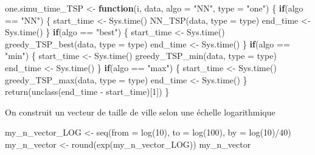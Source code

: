 \documentclass[
]{article}
\newenvironment{Shaded}{\begin{snugshade}}{\end{snugshade}}
\newcommand{\AttributeTok}[1]{\textcolor[rgb]{0.77,0.63,0.00}{#1}}
\newcommand{\ControlFlowTok}[1]{\textcolor[rgb]{0.13,0.29,0.53}{\textbf{#1}}}
\newcommand{\DecValTok}[1]{\textcolor[rgb]{0.00,0.00,0.81}{#1}}
\newcommand{\FunctionTok}[1]{\textcolor[rgb]{0.00,0.00,0.00}{#1}}
\newcommand{\NormalTok}[1]{#1}
\newcommand{\OtherTok}[1]{\textcolor[rgb]{0.56,0.35,0.01}{#1}}
\newcommand{\SpecialCharTok}[1]{\textcolor[rgb]{0.00,0.00,0.00}{#1}}
\newcommand{\StringTok}[1]{\textcolor[rgb]{0.31,0.60,0.02}{#1}}
\begin{document}
\begin{Shaded}
\begin{Highlighting}[]
\NormalTok{one.simu\_time\_TSP }\OtherTok{\textless{}{-}} \ControlFlowTok{function}\NormalTok{(i, data, }\AttributeTok{algo =} \StringTok{"NN"}\NormalTok{, }\AttributeTok{type =} \StringTok{"one"}\NormalTok{)}
\NormalTok{\{}
  \ControlFlowTok{if}\NormalTok{(algo }\SpecialCharTok{==} \StringTok{"NN"}\NormalTok{)}
\NormalTok{  \{}
\NormalTok{    start\_time }\OtherTok{\textless{}{-}} \FunctionTok{Sys.time}\NormalTok{()}
    \FunctionTok{NN\_TSP}\NormalTok{(data, }\AttributeTok{type =}\NormalTok{ type)}
\NormalTok{    end\_time  }\OtherTok{\textless{}{-}} \FunctionTok{Sys.time}\NormalTok{()}
\NormalTok{  \}}
  \ControlFlowTok{if}\NormalTok{(algo }\SpecialCharTok{==} \StringTok{"best"}\NormalTok{)}
\NormalTok{  \{}
\NormalTok{    start\_time }\OtherTok{\textless{}{-}} \FunctionTok{Sys.time}\NormalTok{()}
    \FunctionTok{greedy\_TSP\_best}\NormalTok{(data, }\AttributeTok{type =}\NormalTok{ type)}
\NormalTok{    end\_time  }\OtherTok{\textless{}{-}} \FunctionTok{Sys.time}\NormalTok{()}
\NormalTok{  \}}
  \ControlFlowTok{if}\NormalTok{(algo }\SpecialCharTok{==} \StringTok{"min"}\NormalTok{)}
\NormalTok{  \{}
\NormalTok{    start\_time }\OtherTok{\textless{}{-}} \FunctionTok{Sys.time}\NormalTok{()}
    \FunctionTok{greedy\_TSP\_min}\NormalTok{(data, }\AttributeTok{type =}\NormalTok{ type)}
\NormalTok{    end\_time  }\OtherTok{\textless{}{-}} \FunctionTok{Sys.time}\NormalTok{()}
\NormalTok{  \}}
  \ControlFlowTok{if}\NormalTok{(algo }\SpecialCharTok{==} \StringTok{"max"}\NormalTok{)}
\NormalTok{  \{}
\NormalTok{    start\_time }\OtherTok{\textless{}{-}} \FunctionTok{Sys.time}\NormalTok{()}
    \FunctionTok{greedy\_TSP\_max}\NormalTok{(data, }\AttributeTok{type =}\NormalTok{ type)}
\NormalTok{    end\_time  }\OtherTok{\textless{}{-}} \FunctionTok{Sys.time}\NormalTok{()}
\NormalTok{  \}}
  \FunctionTok{return}\NormalTok{(}\FunctionTok{unclass}\NormalTok{(end\_time }\SpecialCharTok{{-}}\NormalTok{ start\_time)[}\DecValTok{1}\NormalTok{])}
\NormalTok{\}}
\end{Highlighting}
\end{Shaded}

On construit un vecteur de taille de ville selon une échelle
logarithmique

\begin{Shaded}
\begin{Highlighting}[]
\NormalTok{my\_n\_vector\_LOG }\OtherTok{\textless{}{-}} \FunctionTok{seq}\NormalTok{(}\AttributeTok{from =} \FunctionTok{log}\NormalTok{(}\DecValTok{10}\NormalTok{), }\AttributeTok{to =} \FunctionTok{log}\NormalTok{(}\DecValTok{100}\NormalTok{), }\AttributeTok{by =} \FunctionTok{log}\NormalTok{(}\DecValTok{10}\NormalTok{)}\SpecialCharTok{/}\DecValTok{40}\NormalTok{)}
\NormalTok{my\_n\_vector }\OtherTok{\textless{}{-}} \FunctionTok{round}\NormalTok{(}\FunctionTok{exp}\NormalTok{(my\_n\_vector\_LOG))}
\NormalTok{my\_n\_vector}
\end{Highlighting}
\end{Shaded}
\end{document}
